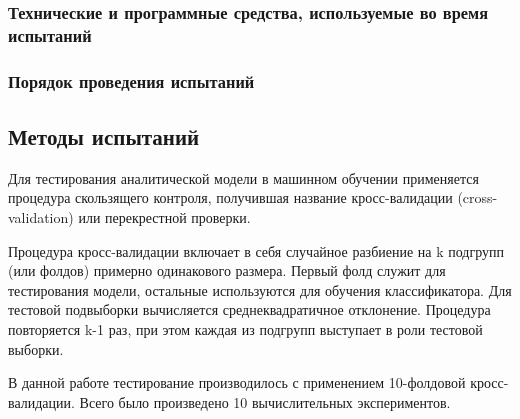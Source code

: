 \subsubsection{Технические и программные средства, используемые во время испытаний}



\subsubsection{Порядок проведения испытаний}


\subsection{Методы испытаний}\label{testing_methods}

Для тестирования аналитической модели в машинном обучении применяется процедура скользящего
контроля, получившая название кросс-валидации (cross-validation) или перекрестной проверки.~\cite{crossval}

Процедура кросс-валидации включает в себя случайное разбиение на k подгрупп (или фолдов) примерно
одинакового размера. Первый фолд служит для тестирования модели, остальные используются для обучения
классификатора. Для тестовой подвыборки вычисляется среднеквадратичное отклонение. Процедура повторяется k-1
раз, при этом каждая из подгрупп выступает в роли тестовой выборки.

В данной работе тестирование производилось с применением 10-фолдовой кросс-валидации. Всего было произведено
10 вычислительных экспериментов.


